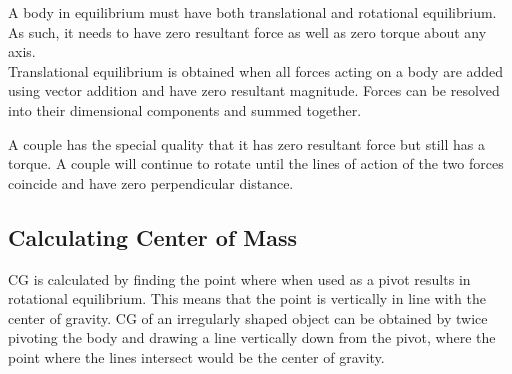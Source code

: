 \documentclass[../main]{subfiles}
\begin{document}
	A body in equilibrium must have both translational and rotational equilibrium. As such, it needs to have zero resultant force as well as zero torque about any axis. \\

	Translational equilibrium is obtained when all forces acting on a body are added using vector addition and have zero resultant magnitude. Forces can be resolved into their dimensional components and summed together. \\






	A couple has the special quality that it has zero resultant force but still has a torque. A couple will continue to rotate until the lines of action of the two forces coincide and have zero perpendicular distance.

	\subsection{Calculating Center of Mass}


	CG is calculated by finding the point where when used as a pivot results in rotational equilibrium. This means that the point is vertically in line with the center of gravity. CG of an irregularly shaped object can be obtained by twice pivoting the body and drawing a line vertically down from the pivot, where the point where the lines intersect would be the center of gravity.
\end{document}
